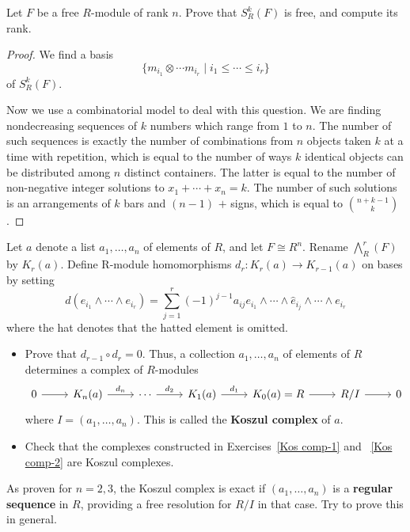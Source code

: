 \begin{exercise}
Let $F$ be a free $R$-module of rank $n$. Prove that $S^{k}_R(F)$ is free, and compute
its rank.
\end{exercise}
\begin{proof}
We find a basis
\[\{m_{i_1}\otimes\cdots m_{i_r}\mid i_1\leqslant\cdots\leqslant i_r\}\]
of $S^k_R(F)$.\par
Now we use a combinatorial model to deal with this question. We are finding nondecreasing sequences of $k$ numbers which range from $1$ to $n$. The number of such sequences is exactly the number of combinations from $n$ objects taken $k$ at a time with repetition, which is equal to the number of ways $k$ identical objects can be distributed among $n$ distinct containers. The latter is equal to the number of non-negative integer solutions to $x_1+\cdots+x_n=k$. The number of such solutions is an arrangements of $k$ bars and $(n-1)$ $+$ signs, which is equal to $\binom{n+k-1}{k}$.
\end{proof}
\begin{exercise}
Let $a$ denote a list $a_1,\dots,a_n$ of elements of $R$, and let $F\cong R^n$. Rename $\bigwedge^r_R(F)$ by $K_r(a)$. Define R-module homomorphisms $d_r:K_r(a)\to K_{r-1}(a)$ on bases by setting
\[d(e_{i_1}\wedge\cdots\wedge e_{i_r})=\sum_{j=1}^{r}(-1)^{j-1}a_{ij}e_{i_1}\wedge\cdots\wedge\widehat{e}_{i_j}\wedge\cdots\wedge e_{i_r}\]
where the hat denotes that the hatted element is omitted.
\begin{itemize}
\item Prove that $d_{r-1}\circ d_r=0$. Thus, a collection $a_1,\dots,a_n$ of elements of $R$ determines a complex of $R$-modules
\[\begin{tikzcd}
0\ar[r]&K_n(a)\ar[r,"d_n"]&\cdots\ar[r,"d_2"]&K_1(a)\ar[r,"d_1"]&K_0(a)=R\ar[r]&R/I\ar[r]&0
\end{tikzcd}\]
where $I=(a_1,\dots,a_n)$. This is called the \textbf{Koszul complex} of $a$.
\item Check that the complexes constructed in Exercises~\ref{Kos comp-1} and ~\ref{Kos comp-2} are
Koszul complexes.
\end{itemize}
As proven for $n=2,3$, the Koszul complex is exact if $(a_1,\dots,a_n)$ is a \textbf{regular sequence} in $R$, providing a free resolution for $R/I$ in that case. Try to prove this in general.
\end{exercise}
